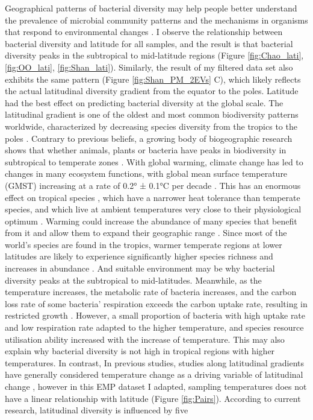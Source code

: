 \documentclass[11pt, a4paper]{article}
\begin{document}
\begin{spacing}{1.5}
Geographical patterns of bacterial diversity may help people better understand the prevalence of microbial community patterns and the mechanisms in organisms that respond to environmental changes \citep{fuhrman2008latitudinal}. I observe the relationship between bacterial diversity and latitude for all samples, and the result is that bacterial diversity peaks in the subtropical to mid-latitude regions (Figure \ref{fig:Chao_lati}, \ref{fig:OO_lati}, \ref{fig:Shan_lati}). Similarly, the result of my filtered data set also exhibits the same pattern (Figure \ref{fig:Shan_PM_2EVs} C), which likely reflects the actual latitudinal diversity gradient from the equator to the poles. Latitude had the best effect on predicting bacterial diversity at the global scale. The latitudinal gradient is one of the oldest and most common biodiversity patterns worldwide, characterized by decreasing species diversity from the tropics to the poles \citep{gaston1996biodiversity, gaston2000global, stevens1989latitudinal}. Contrary to previous beliefs, a growing body of biogeographic research shows that whether animals, plants or bacteria have peaks in biodiversity in subtropical to temperate zones \citep{kerswell2006global, ladau2013global, lucifora2011global, phillips2019global, sato2021potential, tittensor2010global}. With global warming, climate change has led to changes in many ecosystem functions, with global mean surface temperature (GMST) increasing at a rate of 0.2° ± 0.1°C per decade \citep{change2007climate}. This has an enormous effect on tropical species \citep{antao2020temperature, colwell2008global, dillon2010global, pounds1999biological}, which have a narrower heat tolerance than temperate species, and which live at ambient temperatures very close to their physiological optimum \citep{deutsch2008impacts}. Warming could increase the abundance of many species that benefit from it and allow them to expand their geographic range \citep{chen2011rapid, hickling2006distributions, thomas2010climate}. Since most of the world's species are found in the tropics, warmer temperate regions at lower latitudes are likely to experience significantly higher species richness and increases in abundance \citep{bates2014defining, tittensor2010global}. And suitable environment may be why bacterial diversity peaks at the subtropical to mid-latitudes. Meanwhile, as the temperature increases, the metabolic rate of bacteria increases, and the carbon loss rate of some bacteria' respiration exceeds the carbon uptake rate, resulting in restricted growth \citep{smith2019community}. However, a small proportion of bacteria with high uptake rate and low respiration rate adapted to the higher temperature, and species resource utilisation ability increased with the increase of temperature. This may also explain why bacterial diversity is not high in tropical regions with higher temperatures. In contrast, In previous studies, studies along latitudinal gradients have generally considered temperature change as a driving variable of latitudinal change \citep{fierer2011microbes, gaston2000global}, however in this EMP dataset I adapted, sampling temperatures does not have a linear relationship with latitude (Figure \ref{fig:Pairs}). According to current research, latitudinal diversity is influenced by five 
\end{spacing}
\end{document}
